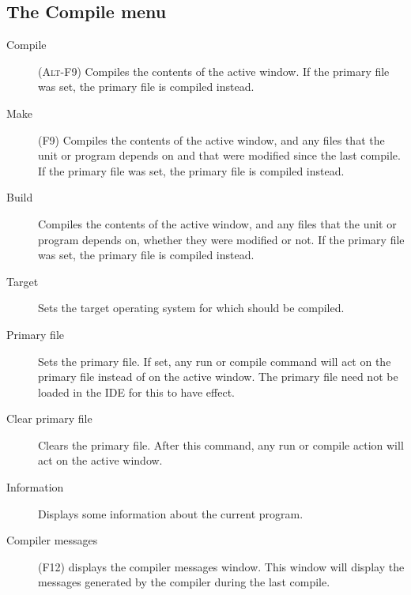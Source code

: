 \subsection{The Compile menu}
\label{se:menucompile}
\begin{description}
\item[Compile] (\textsc{Alt-F9}) Compiles the contents of the active window.  
If the primary file was set, the primary file is compiled instead.
\item[Make] (\textsc{F9}) Compiles the contents of the active window, and
any files that the unit or program depends on and that were modified since
the last compile.
If the primary file was set, the primary file is compiled instead.
\item[Build]
Compiles the contents of the active window, and any files that the unit or 
program depends on, whether they were modified or not.
If the primary file was set, the primary file is compiled instead.
\item[Target] Sets the target operating system for which should be compiled. 
\item[Primary file] Sets the primary file. If set, any run or compile command 
will act on the primary file instead of on the active window. The primary
file need not be loaded in the IDE for this to have effect.
\item[Clear primary file]
Clears the primary file. After this command, any run or compile action will
act on the active window.
\item[Information] Displays some information about the current program.
\item[Compiler messages] (\textsc{F12}) displays the compiler messages
window. This window will display the messages generated by the compiler
during the last compile.
\end{description}
%
%
